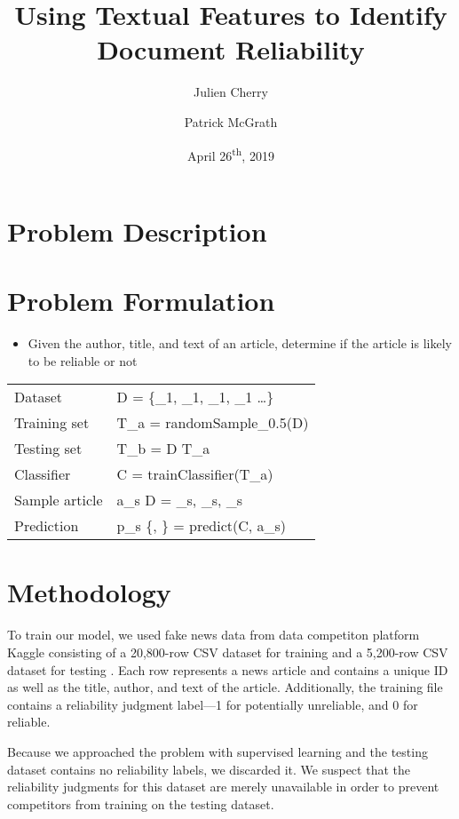 \documentclass[12pt]{article}
\title{Using Textual Features to Identify Document Reliability}
\author{Julien Cherry \and Patrick McGrath}
\date{April 26\textsuperscript{th}, 2019}
\begin{document}
	\maketitle
	\section{Problem Description}

	\section{Problem Formulation}

	\begin{itemize}
		\item Given the author, title, and text of an article, determine if the article is likely to be reliable or not
	\end{itemize}

	\begin{tabular}{l | L}
		Dataset        & D = \{\langle {}_1, _1, _1, _1 \rangle \ldots\} \\
		Training set   & T_a = randomSample_{0.5}(D) \\
		Testing set    & T_b = D \setminus T_a \\
		Classifier     & C = trainClassifier(T_a) \\
		Sample article & a_s \not\in D = \langle {}_s, _s, _s \rangle \\
		Prediction     & p_s \in \{, \} = predict(C, a_s) \\
	\end{tabular}

	\section{Methodology}

	To train our model, we used fake news data from data competiton platform Kaggle consisting of a 20,800-row CSV dataset for training and a 5,200-row CSV dataset for testing \cite{kaggle}. Each row represents a news article and contains a unique ID as well as the title, author, and text of the article. Additionally, the training file contains a reliability judgment label---1 for potentially unreliable, and 0 for reliable.

	Because we approached the problem with supervised learning and the testing dataset contains no reliability labels, we discarded it. We suspect that the reliability judgments for this dataset are merely unavailable in order to prevent competitors from training on the testing dataset.
\end{document}
